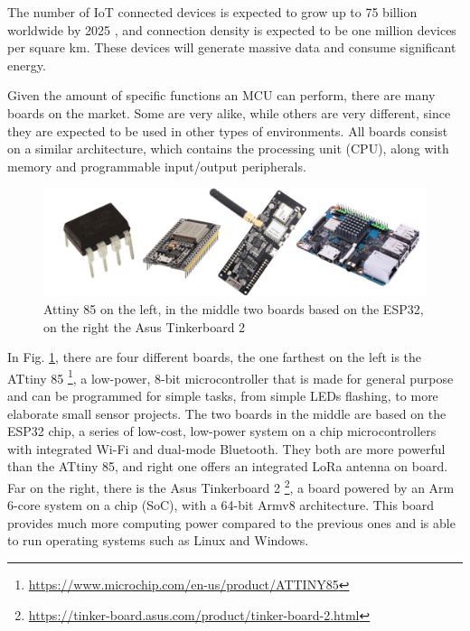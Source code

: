 	The number of IoT connected devices is expected to grow up to 75 billion worldwide by 2025 \cite{statista}, and connection density is expected to be one million devices per square km\cite{noma}.
	These devices will generate massive data and consume significant energy.
	
	Given the amount of specific functions an MCU can perform, there are many boards on the market.
	Some are very alike, while others are very different, since they are expected to be used in other types of environments.
	All boards consist on a similar architecture, which contains the processing unit (CPU), along with memory and programmable input/output peripherals.
	
	\begin{figure}[H]
		\centering
		\includegraphics[width=\textwidth]{resources/img/chap3/generic_board}
		\caption{Attiny 85 on the left, in the middle two boards based on the ESP32, on the right the Asus Tinkerboard 2}
		\label{img:generic_board}
	\end{figure}

	In Fig. \ref{img:generic_board}, there are four different boards, the one farthest on the left is the ATtiny 85 \footnote{\url{https://www.microchip.com/en-us/product/ATTINY85}}, a low-power, 8-bit microcontroller that is made for general purpose and can be programmed for simple tasks, from simple LEDs flashing, to more elaborate small sensor projects.
	The two boards in the middle are based on the ESP32 chip, a series of low-cost, low-power system on a chip microcontrollers with integrated Wi-Fi and dual-mode Bluetooth.
	They both are more powerful than the ATtiny 85, and right one offers an integrated LoRa antenna on board.
	Far on the right, there is the Asus Tinkerboard 2 \footnote{\url{https://tinker-board.asus.com/product/tinker-board-2.html}}, a board powered by an Arm 6-core system on a chip (SoC), with a 64-bit Armv8 architecture.
	This board provides much more computing power compared to the previous ones and is able to run operating systems such as Linux and Windows.
	
